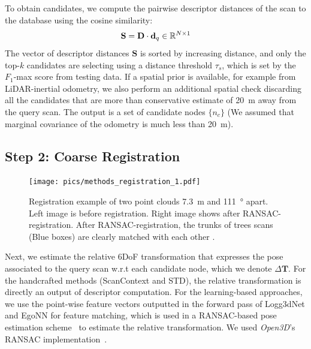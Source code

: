 To obtain candidates, we compute the pairwise descriptor distances of the scan to the database using the cosine similarity:
\begin{equation}
  \mathbf{S} = \mathbf{D} \cdot \mathbf{d}_{q} \in \mathbb{R}^{N \times 1}
\end{equation}
The vector of descriptor distances $\mathbf{S}$ is sorted by increasing distance, and only the top-$k$ candidates are selecting using a distance threshold $\tau_{s}$, which is set by the $F_1$-max score from testing data.
If a spatial prior is available, for example from LiDAR-inertial odometry, we also perform an additional spatial check discarding all the candidates that are more than conservative estimate of \SI{20}{\meter} away from the query scan. The output is a set of candidate nodes $\{ n_c\}$ (We assumed that marginal covariance of the odometry is much less than \SI{20}{\meter}).


\subsection*{\textbf{Step 2: Coarse Registration}}
\label{subsubsec:coarse-registration}
\begin{figure}[htbp]
  \centering
  \texttt{[image: pics/methods\_registration\_1.pdf]}
  \caption{Registration example of two point clouds \SI{7.3}{\meter} and \SI{111}{\degree} apart. Left image is before registration. Right image shows after RANSAC-registration. After RANSAC-registration, the trunks of trees scans (Blue boxes) are clearly matched with each other . }
  \label{fig:registration_example}
\end{figure}
Next, we estimate the relative 6DoF transformation that expresses the pose associated to the query scan w.r.t each candidate node, which we denote $\Delta \mathbf{T}$. For the handcrafted methods (ScanContext and STD), the relative transformation is directly an output of descriptor computation. For the learning-based approaches, we use the point-wise feature vectors outputted in the forward pass of Logg3dNet and EgoNN for feature matching, which is used in a RANSAC-based pose estimation scheme~\cite{fischler1981ransac} to estimate the relative transformation. We used \emph{Open3D}'s RANSAC implementation~\cite{zhou2018}.  

